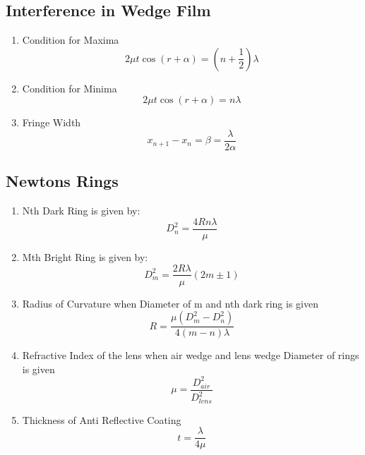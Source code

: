 \documentclass[12pt]{article}
\begin{document}
	\subsection{Interference in Wedge Film}
		\begin{enumerate}
			\item Condition for Maxima
			\begin{equation}
				2\mu t \cos(r + \alpha) = (n + \frac{1}{2}) \lambda
			\end{equation}
			
			\item Condition for Minima
			\begin{equation}
				2\mu t \cos(r + \alpha) = n \lambda
			\end{equation}
			
			\item Fringe Width
			\begin{equation}
				x_{n+1} - x_n = \beta =  \frac{\lambda}{2 \alpha}
			\end{equation}
		\end{enumerate}

	\subsection{Newtons Rings}
	\begin{enumerate}
		\item Nth Dark Ring is given by:
		\begin{equation}
			D_n^2 = \frac{4Rn \lambda}{\mu}
		\end{equation}
		\item Mth Bright Ring is given by:
		\begin{equation}
			D_m^2 = \frac{2R \lambda}{\mu} (2m \pm 1)
		\end{equation}

		\item Radius of Curvature when Diameter of m and nth dark ring is given
		\begin{equation}
			R = \frac{\mu(D_m^2 - D_n^2)}{4(m-n)\lambda}
		\end{equation}

		\item Refractive Index of the lens when air wedge and lens wedge Diameter of rings is given
		\begin{equation}
			\mu = \frac{D_{air}^2}{D_{lens}^2}
		\end{equation}

		\item Thickness of Anti Reflective Coating
		\begin{equation}
			t = \frac{\lambda}{4\mu}
		\end{equation}

	\end{enumerate}
	
\end{document}
